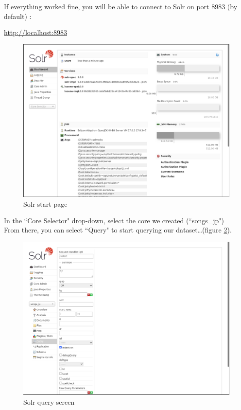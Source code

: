 \bigskip

If everything worked fine, you will be able to connect to Solr on port 8983 (by default) :

\begin{center}
	\url{http://localhost:8983}
\end{center}



\begin{figure}[h]
	\centering
	\includegraphics[width=0.75\linewidth]{files/images/solr-start-page}
	\caption{Solr start page}
	\label{fig:solr-start-page}
\end{figure}


In the ``Core Selector" drop-down, select the core we created (``songs\_jp") \\





From there, you can select ``Query" to start querying our dataset\dots (figure \ref{fig:solr-query}). \\

\newpage

\begin{figure}[h]
	\centering
	\includegraphics[width=0.75\linewidth]{files/images/solr-query}
	\caption{Solr query screen}
	\label{fig:solr-query}
\end{figure}

